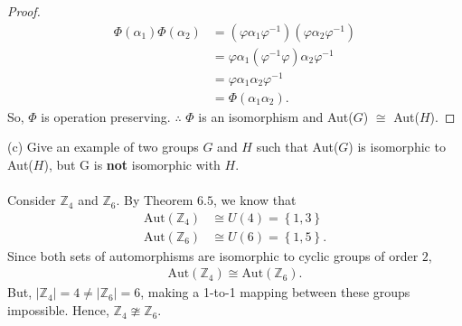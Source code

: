 \documentclass[12pt, letterpaper]{article}
\begin{document}
\begin{proof}
    \begin{align*}
        \Phi(\alpha_{1})\Phi(\alpha_{2}) &= (\varphi\alpha_{1}\varphi^{-1})(\varphi\alpha_{2}\varphi^{-1}) \\  
        &= \varphi\alpha_{1}(\varphi^{-1}\varphi)\alpha_{2} \varphi^{-1} \\
        &= \varphi \alpha_{1}\alpha_{2}\varphi^{-1} \\
        &= \Phi(\alpha_{1}\alpha_{2}).
    \end{align*}
    So, $\Phi$ is operation preserving. $\therefore$ $\Phi$ is an isomorphism and Aut($G$) $\cong$ Aut($H$).
\end{proof}
\quad (c) Give an example of two groups $G$ and $H$ such that Aut($G$) is isomorphic to Aut($H$), but G is \textbf{not} isomorphic with $H$. \\ \\
Consider $\mathbb{Z}_{4}$ and $\mathbb{Z}_{6}$. By Theorem $6.5$, we know that 
\begin{align*}
   \text{Aut}(\mathbb{Z}_{4}) &\cong U(4) = \left\{1, 3\right\} \\
    \text{Aut}(\mathbb{Z}_{6}) &\cong U(6) = \left\{1, 5\right\}.
\end{align*}
Since both sets of automorphisms are isomorphic to cyclic groups of order $2$,
\begin{align*}
    \text{Aut}(\mathbb{Z}_{4}) \cong \text{Aut}(\mathbb{Z}_6). 
\end{align*}
But, $|\mathbb{Z}_{4}| =4 \neq |\mathbb{Z}_{6}| = 6$, making a 1-to-1 mapping between these groups impossible. Hence, 
$\mathbb{Z}_4 \ncong \mathbb{Z}_{6}$. 
\end{document}
